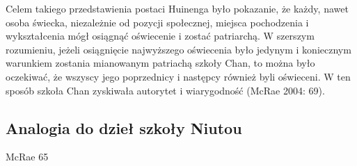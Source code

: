 Celem takiego przedstawienia postaci Huinenga było pokazanie, że każdy, nawet osoba świecka, niezależnie od pozycji społecznej, miejsca pochodzenia i wykształcenia mógł osiągnąć oświecenie i zostać patriarchą. W szerszym rozumieniu, jeżeli osiągnięcie najwyższego oświecenia było jedynym i koniecznym warunkiem zostania mianowanym patriachą szkoły Chan, to można było oczekiwać, że wszyscy jego poprzednicy i następcy również byli oświeceni. W ten sposób szkoła Chan zyskiwała autorytet i wiarygodność (McRae 2004: 69).


\subsection{Analogia do dzieł szkoły Niutou}
McRae 65

